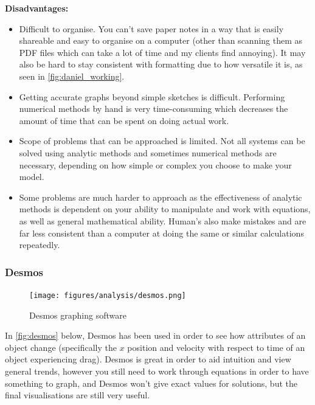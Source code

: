 \documentclass[11pt]{article}
\begin{document}
                \textbf{Disadvantages:}
                \begin{itemize}
                    \item Difficult to organise. You can't save paper notes in a way that is easily shareable and easy to organise on a computer (other than scanning them as PDF files which can take a lot of time and my clients find annoying). It may also be hard to stay consistent with formatting due to how versatile it is, as seen in \autoref{fig:daniel_working}.
                    \item Getting accurate graphs beyond simple sketches is difficult. Performing numerical methods by hand is very time-consuming which decreases the amount of time that can be spent on doing actual work. 
                    \item Scope of problems that can be approached is limited. Not all systems can be solved using analytic methods and sometimes numerical methods are necessary, depending on how simple or complex you choose to make your model.
                    \item Some problems are much harder to approach as the effectiveness of analytic methods is dependent on your ability to manipulate and work with equations, as well as general mathematical ability. Human's also make mistakes and are far less consistent than a computer at doing the same or similar calculations repeatedly.
                \end{itemize}

            \subsubsection{Desmos}

                \begin{figure}[!ht]
                    \centering
                    \texttt{[image: figures/analysis/desmos.png]}
                    \caption{Desmos graphing software}
                    \label{fig:desmos}
                \end{figure}


                In \autoref{fig:desmos} below, Desmos has been used in order to see how attributes of an object change (specifically the $x$ position and velocity with respect to time of an object experiencing drag). Desmos is great in order to aid intuition and view general trends, however you still need to work through equations in order to have something to graph, and Desmos won't give exact values for solutions, but the final visualisations are still very useful. 
\end{document}
